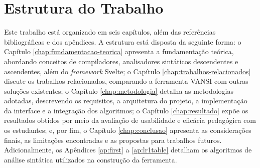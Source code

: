 \section{Estrutura do Trabalho} \label{sec:estrutura}

Este trabalho está organizado em seis capítulos, além das referências bibliográficas e dos apêndices. A estrutura está disposta da seguinte forma: o Capítulo \ref{chap:fundamentacao-teorica} apresenta a fundamentação teórica, abordando conceitos de compiladores, analisadores sintáticos descendentes e ascendentes, além do \textit{framework} Svelte; o Capítulo \ref{chap:trabalhos-relacionados} discute os trabalhos relacionados, comparando a ferramenta VANSI com outras soluções existentes; o Capítulo \ref{chap:metodologia} detalha as metodologias adotadas, descrevendo os requisitos, a arquitetura do projeto, a implementação da interface e a integração dos algoritmos; o Capítulo \ref{chap:resultado} expõe os resultados obtidos por meio da avaliação de usabilidade e eficácia pedagógica com os estudantes; e, por fim, o Capítulo \ref{chap:conclusao} apresenta as considerações finais, as limitações encontradas e as propostas para trabalhos futuros. Adicionalmente, os Apêndices \ref{ap:first} a \ref{ap:lr1table} detalham os algoritmos de análise sintática utilizados na construção da ferramenta.
